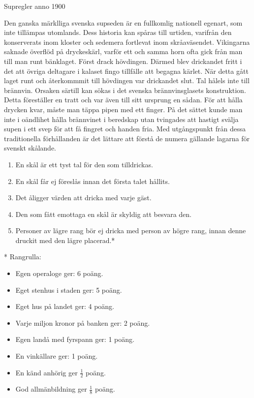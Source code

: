 \newpage
\begin{flushleft}
{\Huge Supregler anno 1900\\}
\end{flushleft}
{\large
Den ganska märklliga svenska supseden är en fullkomlig nationell egenart, som inte tillämpas utomlands.
Dess historia kan spåras till urtiden, varifrån den konserverats inom kloster och sedemera fortlevat inom skråaväsendet.
Vikingarna saknade överflöd på dryckeskärl, varför ett och samma horn ofta gick från man till man runt bänklaget.
Först drack hövdingen.
Därmed blev drickandet fritt i det att övriga deltagare i kalaset fingo tillfälle att begagna kärlet.
När detta gått laget runt och återkommmit till hövdingen var drickandet slut.
Tal hålels inte till brännvin.
Orsaken särtill kan sökas i det svenska brännvinsglasets konstruktion.
Detta föreställer en tratt och var även till sitt ursprung en sådan.
För att hålla drycken kvar, måste man täppa pipen med ett finger.
På det sättet kunde man inte i oändlihet hålla brännvinet i beredskap
utan tvingades att hastigt svälja supen i ett svep för att få fingret och handen fria.
Med utgångspunkt från dessa traditionella förhållanden
är det lättare att förstå de numera gällande lagarna för svenskt skålande.
\begin{enumerate}
\item En skål är ett tyst tal för den som tilldrickas.
\item En skål får ej föreslås innan det första talet hållits.
\item Det åligger värden att dricka med varje gäst.
\item Den som fått emottaga en skål är skyldig att besvara den.
\item Personer av lägre rang bör ej dricka med person av högre rang,
innan denne druckit med den lägre placerad.*
\end{enumerate}
\newpage

* Rangrulla:
\begin{itemize}
    \item Egen operaloge ger: 6 poäng.
    \item Eget stenhus i staden ger: 5 poäng.
    \item Eget hus på landet ger: 4 poäng.
    \item Varje miljon kronor på banken ger: 2 poäng.
    \item Egen landå med fyrspann ger: 1 poäng.
    \item En vinkällare ger: 1 poäng.
    \item En känd anhörig ger $\frac{1}{2}$ poäng.
    \item God allmänbildning ger $\frac{1}{8}$ poäng.
\end{itemize}
}

